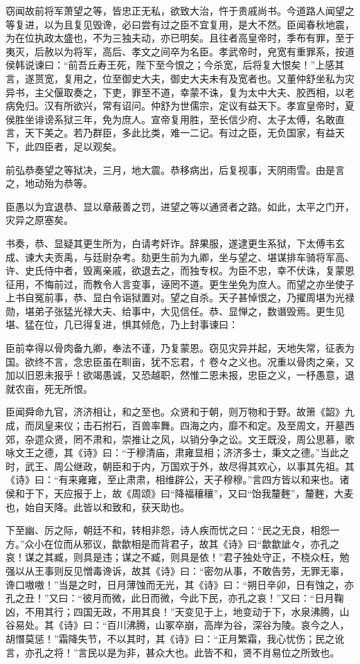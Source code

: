 \documentclass[]{article}
\begin{document}
窃闻故前将军萧望之等，皆忠正无私，欲致大治，忤于贵戚尚书。今道路人闻望之等复进，以为且复见毁谗，必曰尝有过之臣不宜复用，是大不然。臣闻春秋地震，为在位执政太盛也，不为三独夫动，亦已明矣。且往者高皇帝时，季布有罪，至于夷灭，后赦以为将军，高后、孝文之间卒为名臣。孝武帝时，皃宽有重罪系，按道侯韩说谏曰：``前吾丘寿王死，陛下至今恨之；今杀宽，后将复大恨矣！''上感其言，遂贳宽，复用之，位至御史大夫，御史大夫未有及宽者也。又董仲舒坐私为灾异书，主父偃取奏之，下吏，罪至不道，幸蒙不诛，复为太中大夫、胶西相，以老病免归。汉有所欲兴，常有诏问。仲舒为世儒宗，定议有益天下。孝宣皇帝时，夏侯胜坐诽谤系狱三年，免为庶人。宣帝复用胜，至长信少府、太子太傅，名敢直言，天下美之。若乃群臣，多此比类，难一二记。有过之臣，无负国家，有益天下，此四臣者，足以观矣。

前弘恭奏望之等狱决，三月，地大震。恭移病出，后复视事，天阴雨雪。由是言之，地动殆为恭等。

臣愚以为宜退恭、显以章蔽善之罚，进望之等以通贤者之路。如此，太平之门开，灾异之原塞矣。

书奏，恭、显疑其更生所为，白请考奸诈。辞果服，遂逮更生系狱，下太傅韦玄成、谏大夫贡禹，与廷尉杂考。劾更生前为九卿，坐与望之、堪谋排车骑将军高、许、史氏侍中者，毁离亲戚，欲退去之，而独专权。为臣不忠，幸不伏诛，复蒙恩征用，不悔前过，而教令人言变事，诬罔不道。更生坐免为庶人。而望之亦坐使子上书自冤前事，恭、显白令诣狱置对。望之自杀。天子甚悼恨之，乃擢周堪为光禄勋，堪弟子张猛光禄大夫、给事中，大见信任。恭、显惮之，数谮毁焉。更生见堪、猛在位，几已得复进，惧其倾危，乃上封事谏曰：

臣前幸得以骨肉备九卿，奉法不谨，乃复蒙恩。窃见灾异并起，天地失常，征表为国。欲终不言，念忠臣虽在甽亩，犹不忘君，忄卷々之义也。况重以骨肉之亲，又加以旧恩未报乎！欲竭愚诚，又恐越职，然惟二恩未报，忠臣之义，一杼愚意，退就农亩，死无所恨。

臣闻舜命九官，济济相让，和之至也。众贤和于朝，则万物和于野。故箫《韶》九成，而凤皇来仪；击石拊石，百兽率舞。四海之内，靡不和定。及至周文，开墓西郊，杂遝众贤，罔不肃和，崇推让之风，以销分争之讼。文王既没，周公思慕，歌咏文王之德，其《诗》曰：``于穆清庙，肃雍显相；济济多士，秉文之德。''当此之时，武王、周公继政，朝臣和于内，万国欢于外，故尽得其欢心，以事其先祖。其《诗》曰：``有来雍雍，至止肃肃，相维辟公，天子穆穆。''言四方皆以和来也。诸侯和于下，天应报于上，故《周颂》曰``降福穰穰''，又曰``饴我釐麰''，釐麰，大麦也，始自天降。此皆以和致和，获天助也。

下至幽、厉之际，朝廷不和，转相非怨，诗人疾而忧之曰：``民之无良，相怨一方。''众小在位而从邪议，歙歙相是而背君子，故其《诗》曰``歙歙訿々，亦孔之哀！谋之其臧，则具是违；谋之不臧，则具是依！''君子独处守正，不桡众枉，勉强以从王事则反见憎毒谗诉，故其《诗》曰：``密勿从事，不敢告劳，无罪无辜，谗口嗷嗷！''当是之时，日月薄蚀而无光，其《诗》曰：``朔日辛卯，日有蚀之，亦孔之丑！''又曰：``彼月而微，此日而微，今此下民，亦孔之哀！''又曰：``日月鞠凶，不用其行；四国无政，不用其良！''天变见于上，地变动于下，水泉沸腾，山谷易处。其《诗》曰：``百川沸腾，山冢卒崩，高岸为谷，深谷为陵。哀今之人，胡憯莫惩！''霜降失节，不以其时，其《诗》曰：``正月繁霜，我心忧伤；民之讹言，亦孔之将！''言民以是为非，甚众大也。此皆不和，贤不肖易位之所致也。
\end{document}
